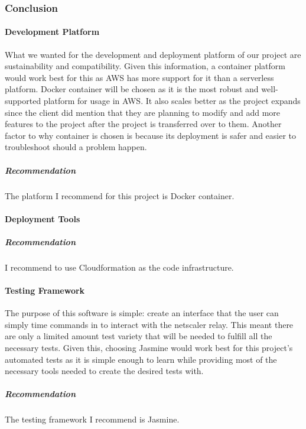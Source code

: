 \subsubsection{Conclusion}

\paragraph{Development Platform}
What we wanted for the development and deployment platform of our project are sustainability and compatibility.
Given this information, a container platform would work best for this as AWS has more support for it than a serverless platform.
Docker container will be chosen as it is the most robust and well-supported platform for usage in AWS.
It also scales better as the project expands since the client did mention that they are planning to modify and add more features to the project after the project is transferred over to them.
Another factor to why container is chosen is because its deployment is safer and easier to troubleshoot should a problem happen.
\subparagraph{Recommendation}
The platform I recommend for this project is Docker container.

\paragraph{Deployment Tools}

\subparagraph{Recommendation}
I recommend to use Cloudformation as the code infrastructure.

\paragraph{Testing Framework}
The purpose of this software is simple: create an interface that the user can simply time commands in to interact with the netscaler relay.
This meant there are only a limited amount test variety that will be needed to fulfill all the necessary tests.
Given this, choosing Jasmine would work best for this project's automated tests as it is simple enough to learn while providing most of the necessary tools needed to create the desired tests with.
\subparagraph{Recommendation}
The testing framework I recommend is Jasmine.